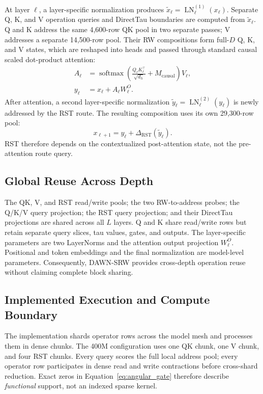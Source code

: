 \documentclass{article}
\newcommand{\DAWN}{DAWN-SRW}
\begin{document}
At layer \(\ell\), a layer-specific normalization produces
\(\tilde x_\ell=\operatorname{LN}^{(1)}_\ell(x_\ell)\).
Separate Q, K, and V operation queries and DirectTau boundaries are computed
from \(\tilde x_\ell\). Q and K address the same 4,600-row QK pool in two
separate passes; V addresses a separate 14,500-row pool. Their RW compositions
form full-\(D\) Q, K, and V states, which are reshaped into heads and passed
through standard causal scaled dot-product attention:
\begin{align}
A_\ell&=\operatorname{softmax}\!\left(
\frac{Q_\ell K_\ell^\top}{\sqrt{d_h}}+M_{\mathrm{causal}}\right)V_\ell,\\
y_\ell&=x_\ell+A_\ell W^{O}_{\ell}.
\label{eq:attention}
\end{align}
After attention, a second layer-specific normalization
\(\tilde y_\ell=\operatorname{LN}^{(2)}_\ell(y_\ell)\) is newly addressed by
the RST route. The resulting composition uses its own 29,300-row pool:
\begin{equation}
x_{\ell+1}=y_\ell+\Delta_{\mathrm{RST}}(\tilde y_\ell).
\label{eq:rst}
\end{equation}
RST therefore depends on the contextualized post-attention state, not the
pre-attention route query.

\subsection{Global Reuse Across Depth}
\label{sec:reuse}

The QK, V, and RST read/write pools; the two RW-to-address probes; the Q/K/V
query projection; the RST query projection; and their DirectTau projections
are shared across all \(L\) layers. Q and K share read/write rows but retain
separate query slices, tau values, gates, and outputs. The layer-specific
parameters are two LayerNorms and the attention output projection
\(W^O_\ell\). Positional and token embeddings and the final normalization are
model-level parameters. Consequently, \DAWN{} provides cross-depth operation
reuse without claiming complete block sharing.

\subsection{Implemented Execution and Compute Boundary}
\label{sec:implemented-boundary}

The implementation shards operator rows across the model mesh and processes
them in dense chunks. The 400M configuration uses one QK chunk, one V chunk,
and four RST chunks. Every query scores the full local address pool; every
operator row participates in dense read and write contractions before
cross-shard reduction. Exact zeros in Equation~\ref{eq:angular_gate} therefore
describe \emph{functional} support, not an indexed sparse kernel.
\end{document}
